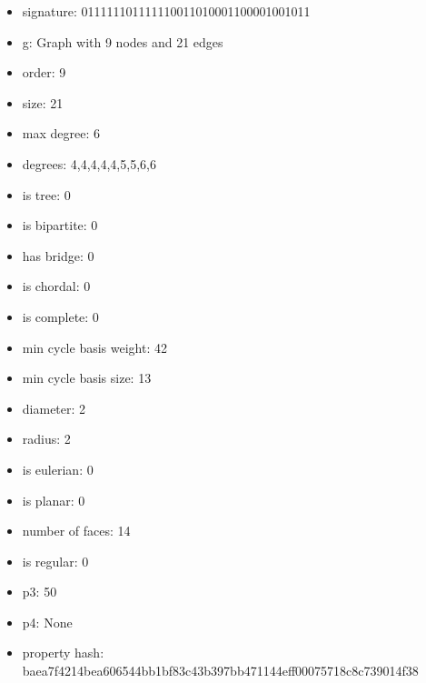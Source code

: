 \newpage
\begin{figure}
\end{figure}
\begin{itemize}
\item signature: 011111101111110011010001100001001011
\item g: Graph with 9 nodes and 21 edges
\item order: 9
\item size: 21
\item max degree: 6
\item degrees: 4,4,4,4,4,5,5,6,6
\item is tree: 0
\item is bipartite: 0
\item has bridge: 0
\item is chordal: 0
\item is complete: 0
\item min cycle basis weight: 42
\item min cycle basis size: 13
\item diameter: 2
\item radius: 2
\item is eulerian: 0
\item is planar: 0
\item number of faces: 14
\item is regular: 0
\item p3: 50
\item p4: None
\item property hash: baea7f4214bea606544bb1bf83c43b397bb471144eff00075718c8c739014f38
\end{itemize}
